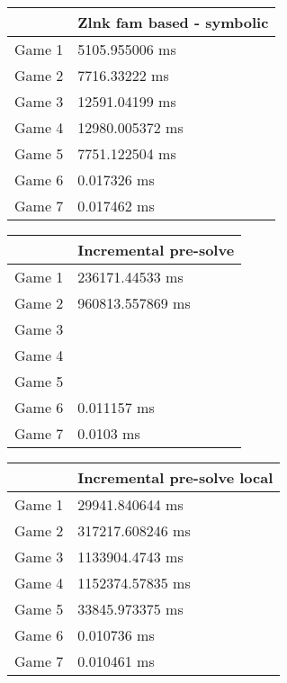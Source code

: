 \begin{tabular}{|l|l|}
	\hline
	& Zlnk fam based - symbolic \\ \hline
	Game 1 & 5105.955006 ms \\ \hline
	Game 2 & 7716.33222 ms \\ \hline
	Game 3 & 12591.04199 ms \\ \hline
	Game 4 & 12980.005372 ms \\ \hline
	Game 5 & 7751.122504 ms \\ \hline
	Game 6 & 0.017326 ms \\ \hline
	Game 7 & 0.017462 ms \\ \hline
\end{tabular}
\begin{tabular}{|l|l|}
	\hline
	& Incremental pre-solve \\ \hline
	Game 1 & 236171.44533 ms \\ \hline
	Game 2 & 960813.557869 ms \\ \hline
	Game 3 & \dag \\ \hline
	Game 4 & \dag \\ \hline
	Game 5 & \dag \\ \hline
	Game 6 & 0.011157 ms \\ \hline
	Game 7 & 0.0103 ms \\ \hline
\end{tabular}
\begin{tabular}{|l|l|}
	\hline
	& Incremental pre-solve local \\ \hline
	Game 1 & 29941.840644 ms \\ \hline
	Game 2 & 317217.608246 ms \\ \hline
	Game 3 & 1133904.4743 ms \\ \hline
	Game 4 & 1152374.57835 ms \\ \hline
	Game 5 & 33845.973375 ms \\ \hline
	Game 6 & 0.010736 ms \\ \hline
	Game 7 & 0.010461 ms \\ \hline
\end{tabular}

